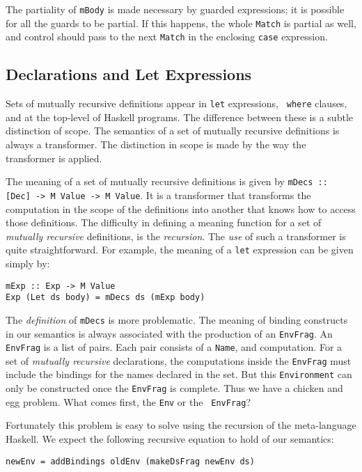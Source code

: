 \documentclass{entcs} \usepackage{entcsmacro}
\begin{document}
{The partiality of {\tt mBody} is made necessary by guarded expressions; it is
possible for all the guards to be partial. If this happens, the whole {\tt Match}
is partial as well, and control should pass to the next {\tt Match} in the
enclosing {\tt case} expression.


\subsection{Declarations and Let Expressions}\label{decs}

Sets of mutually recursive definitions appear in {\tt let} expressions, {\tt
where} clauses, and at the top-level of Haskell programs. The difference
between these is a subtle distinction of scope. The semantics of a set of
mutually recursive definitions is always a transformer. The distinction in
scope is made by the way the transformer is applied.

The meaning of a set of mutually recursive definitions is given by {\tt mDecs :: [Dec]
-> M Value -> M Value}. It is a transformer that transforms the computation in the scope
of the definitions into another that knows how to access those definitions. The difficulty
in defining a meaning function for a set of {\em mutually recursive} definitions, is the
{\em recursion}. The {\em use} of such a transformer is quite straightforward. For example,
the meaning of a {\tt let} expression can be given simply by:

{\small
\begin{verbatim}
mExp :: Exp -> M Value
Exp (Let ds body) = mDecs ds (mExp body)
\end{verbatim}
}

The {\em definition} of {\tt mDecs} is more problematic. The meaning of
binding constructs in our semantics is always associated with the production
of an {\tt EnvFrag}. An {\tt EnvFrag} is a list of pairs. Each pair consists
of a {\tt Name}, and computation. For a set of {\em mutually recursive}
declarations, the computations inside the {\tt EnvFrag} must include the
bindings for the names declared in the set. But this {\tt Environment} can
only be constructed once the {\tt EnvFrag} is complete. Thus we have a
chicken and egg problem. What comes first, the {\tt Env} or the {\tt
EnvFrag}?

Fortunately this problem is easy to solve using the recursion of the meta-language
Haskell. We expect the following recursive equation to hold of our semantics:

{\small
\begin{verbatim}
newEnv = addBindings oldEnv (makeDsFrag newEnv ds)
\end{verbatim}
}

}
\end{document}
